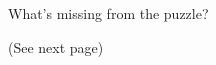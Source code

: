 \documentclass{puzz}
\begin{document}

\begin{center}
    What's missing from the puzzle?

    {\small (See next page)}
\end{center}


\end{document}
